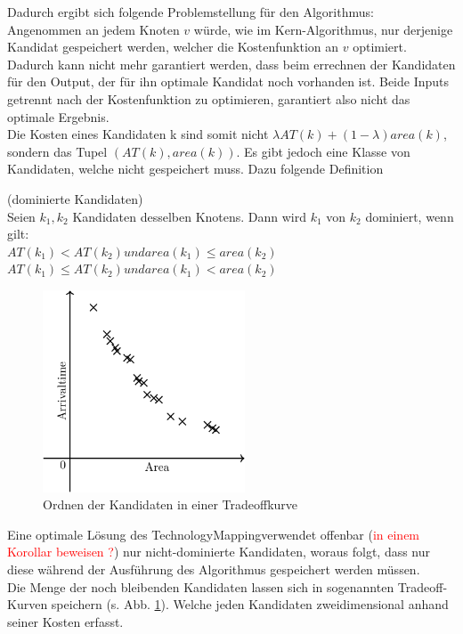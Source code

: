 \documentclass[11pt, a4paper, german]{article}
\newcommand{\TM}{TechnologyMapping}
\begin{document}
Dadurch ergibt sich folgende Problemstellung für den Algorithmus: \\
Angenommen an jedem Knoten $v$ würde, wie im Kern-Algorithmus, nur derjenige Kandidat gespeichert werden, welcher die Kostenfunktion an $v$ optimiert. Dadurch kann nicht mehr garantiert werden, dass beim errechnen der Kandidaten für den Output, der für ihn optimale Kandidat noch vorhanden ist. Beide Inputs getrennt nach der Kostenfunktion zu optimieren, garantiert also nicht das optimale Ergebnis.\\

Die Kosten eines Kandidaten k sind somit nicht $\lambda AT(k) +(1-\lambda )area(k)$,  sondern das Tupel $(AT(k), area(k))$.
Es gibt jedoch eine Klasse von Kandidaten, welche nicht gespeichert muss. Dazu folgende Definition\\

\begin{definition}{(dominierte Kandidaten)}\\
	Seien $k_1, k_2$ Kandidaten desselben Knotens. Dann wird $k_1$ von $k_2$ dominiert, wenn gilt:\\
	$AT(k_1) < AT(k_2) und area(k_1) \leq area(k_2)$\\
	$	AT(k_1) \leq AT(k_2) und area(k_1) < area(k_2)$\\	
\end{definition}

 \begin{figure}
		\includegraphics[width = 6cm]{pictures/compiled/tradeoff_kurve}
		\caption{Ordnen der Kandidaten in einer Tradeoffkurve}
		\label{bild:tradeoff_kurve}
\end{figure}
Eine optimale Lösung des \TM verwendet offenbar (\textcolor{red}{in einem Korollar beweisen ?}) nur nicht-dominierte Kandidaten, woraus folgt, dass nur diese während der Ausführung des Algorithmus gespeichert werden müssen.\\
Die Menge der noch bleibenden Kandidaten lassen sich in sogenannten Tradeoff-Kurven speichern (s. Abb. \ref{bild:tradeoff_kurve}). Welche jeden Kandidaten zweidimensional anhand seiner Kosten erfasst.\\
\end{document}
